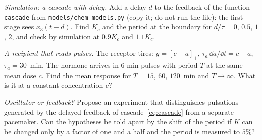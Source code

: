 \begin{exercise}[\lvlB]
\label{ex:16:5}
\emph{Simulation: a cascade with delay.} Add a delay $d$ to the feedback of the function \texttt{cascade} from \texttt{models/\allowbreak chem\_models.py} (copy it; do not run the file): the first stage sees $x_3(t-d)$. Find $K_c$ and the period at the boundary for $d/\tau=0$, $0.5$, $1$, $2$, and check by simulation at $0.9K_c$ and $1.1K_c$.
\end{exercise}

\begin{exercise}[\lvlB]
\label{ex:16:6}
\emph{A recipient that reads pulses.} The receptor tires: $y=[c-a]_+$, $\tau_a\,\dd a/\dd t=c-a$, $\tau_a=30$~min. The hormone arrives in $6$-min pulses with period $T$ at the same mean dose $\bar c$. Find the mean response for $T=15$, $60$, $120$~min and $T\to\infty$. What is it at a constant concentration $\bar c$?
\end{exercise}

\begin{exercise}[\lvlC]
\label{ex:16:7}
\emph{Oscillator or feedback?} Propose an experiment that distinguishes pulsations generated by the delayed feedback of cascade~\eqref{eq:cascade} from a separate pacemaker. Can the hypotheses be told apart by the shift of the period if $K$ can be changed only by a factor of one and a half and the period is measured to $5\%$?
\end{exercise}
